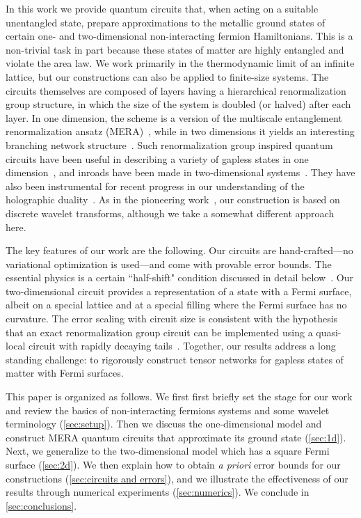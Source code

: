 \documentclass[aps,pra,reprint,superscriptaddress,floatfix,amsmath,amssymb,amsfonts]{revtex4-1}
\begin{document}
In this work we provide quantum circuits that, when acting on a suitable unentangled state, prepare approximations to the metallic ground states of certain one- and two-dimensional non-interacting fermion Hamiltonians.
This is a non-trivial task in part because these states of matter are highly entangled and violate the area law. We work primarily in the thermodynamic limit of an infinite lattice, but our constructions can also be applied to finite-size systems. The circuits themselves are composed of layers having a hierarchical renormalization group structure, in which the size of the system is doubled (or halved) after each layer.
In one dimension, the scheme is a version of the multiscale entanglement renormalization ansatz (MERA)~\citep{vidal2008mera}, while in two dimensions it yields an interesting branching network structure~\cite{evenbly2014branchmera}.
Such renormalization group inspired quantum circuits have been useful in describing a variety of gapless states in one dimension~\cite{montangero2009critmera,pfeifer2009critmera,corboz2010intfmera,evenbly2010ffmera}, and inroads have been made in two-dimensional systems~\cite{evenbly2010entanglement,aguado2008topomera,cincio20082dmera,evenbly20092dmera,swingle2016sqrt}.
They have also been instrumental for recent progress in our understanding of the holographic duality~\cite{swingle2012entanglement,qi2013exact,pastawski2015holographic,hayden2016holographic}.
As in the pioneering work~\cite{evenbly2016entanglement}, our construction is based on discrete wavelet transforms, although we take a somewhat different approach here.

The key features of our work are the following. Our circuits are hand-crafted---no variational optimization is used---and come with provable error bounds.
The essential physics is a certain ``half-shift" condition discussed in detail below~\cite{selesnick2002design}. Our two-dimensional circuit provides a representation of a state with a Fermi surface, albeit on a special lattice and at a special filling where the Fermi surface has no curvature.
The error scaling with circuit size is consistent with the hypothesis that an exact renormalization group circuit can be implemented using a quasi-local circuit with rapidly decaying tails~\cite{swingle2016ssourcery}.
Together, our results address a long standing challenge: to rigorously construct tensor networks for gapless states of matter with Fermi surfaces.

This paper is organized as follows.
We first first briefly set the stage for our work and review the basics of non-interacting fermions systems and some wavelet terminology (\cref{sec:setup}).
Then we discuss the one-dimensional model and construct MERA quantum circuits that approximate its ground state (\cref{sec:1d}).
Next, we generalize to the two-dimensional model which has a square Fermi surface (\cref{sec:2d}).
We then explain how to obtain \emph{a priori} error bounds for our constructions (\cref{sec:circuits and errors}), and we illustrate the effectiveness of our results through numerical experiments (\cref{sec:numerics}).
We conclude in \cref{sec:conclusions}.
\end{document}

